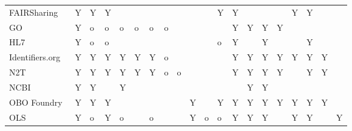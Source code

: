 \begin{table}
\begin{tabular}{llllllllllllllllllll}
         FAIRSharing~\cite{Sansone2019} &              Y &        Y &     Y &            &            &          &                &               &         &         &       Y &                          Y &           &                   &                    &             Y &               Y &                &               \\
GO~\cite{TheGeneOntologyConsortium2019} &              Y &        o &     o &          o &          o &        o &              o &               &         &         &         &                          Y &         Y &                 Y &                  Y &               &                 &                &               \\
                  HL7~\cite{Bender2013} &              Y &        o &     o &            &            &          &                &               &         &         &       o &                          Y &           &                 Y &                    &               &               Y &                &               \\
        Identifiers.org~\cite{Juty2012} &              Y &        Y &     Y &          Y &          Y &        Y &              o &               &         &         &         &                          Y &         Y &                 Y &                  Y &             Y &               Y &              Y &               \\
             N2T~\cite{Wimalaratne2018} &              Y &        Y &     Y &          Y &          Y &        Y &              o &             o &         &         &         &                          Y &         Y &                 Y &                  Y &               &               Y &              Y &               \\
                  NCBI~\cite{Clark2016} &              Y &        Y &       &          Y &            &          &                &               &         &         &         &                            &         Y &                 Y &                    &               &                 &                &               \\
         OBO Foundry~\cite{Jackson2021} &              Y &        Y &     Y &            &            &          &                &               &       Y &         &       Y &                          Y &         Y &                 Y &                  Y &             Y &               Y &              Y &               \\
                   OLS~\cite{Cote2006a} &              Y &        o &     Y &          o &            &        o &                &               &       Y &       o &       o &                          Y &         Y &                 Y &                    &             Y &               Y &                &             Y \\

\end{tabular}
\end{table}
